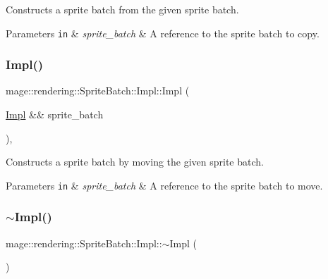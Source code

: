 Constructs a sprite batch from the given sprite batch.


\begin{DoxyParams}[1]{Parameters}
\mbox{\tt in}  & {\em sprite\+\_\+batch} & A reference to the sprite batch to copy. \\
\hline
\end{DoxyParams}
\hypertarget{classmage_1_1rendering_1_1_sprite_batch_1_1_impl_a0f9d79fb3a897c1365f5e15a1eaf01f9}{}\label{classmage_1_1rendering_1_1_sprite_batch_1_1_impl_a0f9d79fb3a897c1365f5e15a1eaf01f9} 
\subsubsection{\texorpdfstring{Impl()}{Impl()}\hspace{0.1cm}{\footnotesize\ttfamily [3/3]}}
{\footnotesize\ttfamily mage\+::rendering\+::\+Sprite\+Batch\+::\+Impl\+::\+Impl (\begin{DoxyParamCaption}\item[{\hyperlink{classmage_1_1rendering_1_1_sprite_batch_1_1_impl}{Impl} \&\&}]{sprite\+\_\+batch }\end{DoxyParamCaption})\hspace{0.3cm}{\ttfamily [default]}, {\ttfamily [noexcept]}}

Constructs a sprite batch by moving the given sprite batch.


\begin{DoxyParams}[1]{Parameters}
\mbox{\tt in}  & {\em sprite\+\_\+batch} & A reference to the sprite batch to move. \\
\hline
\end{DoxyParams}
\hypertarget{classmage_1_1rendering_1_1_sprite_batch_1_1_impl_a32ea1f2a4d1f11c19594e1d4eaa36f6c}{}\label{classmage_1_1rendering_1_1_sprite_batch_1_1_impl_a32ea1f2a4d1f11c19594e1d4eaa36f6c} 
\subsubsection{\texorpdfstring{$\sim$\+Impl()}{~Impl()}}
{\footnotesize\ttfamily mage\+::rendering\+::\+Sprite\+Batch\+::\+Impl\+::$\sim$\+Impl (\begin{DoxyParamCaption}{ }\end{DoxyParamCaption})\hspace{0.3cm}{\ttfamily [default]}}

